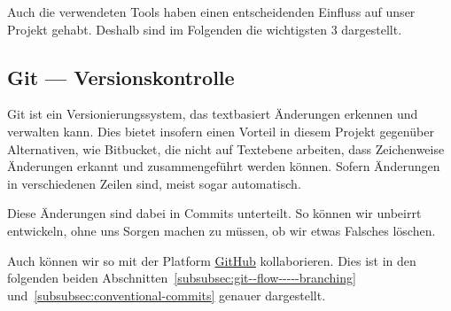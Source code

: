 Auch die verwendeten Tools haben einen entscheidenden Einfluss auf unser Projekt gehabt.
Deshalb sind im Folgenden die wichtigsten 3 dargestellt.


\subsection{Git --- Versionskontrolle}\label{subsec:git-----versionskontrolle}
    Git ist ein Versionierungssystem, das textbasiert Änderungen erkennen und verwalten kann.
    Dies bietet insofern einen Vorteil in diesem Projekt gegenüber Alternativen, wie Bitbucket, die nicht auf Textebene arbeiten, dass Zeichenweise Änderungen erkannt und zusammengeführt werden können.
    Sofern Änderungen in verschiedenen Zeilen sind, meist sogar automatisch.


    Diese Änderungen sind dabei in Commits unterteilt.
    So können wir unbeirrt entwickeln, ohne uns Sorgen machen zu müssen, ob wir etwas Falsches löschen.


    Auch können wir so mit der Platform \href{https://github.com/WHS-SLAB-WiSe22-23-P1/Labyrinth}{GitHub} kollaborieren.
    Dies ist in den folgenden beiden Abschnitten~\ref{subsubsec:git--flow-----branching} und~\ref{subsubsec:conventional-commits} genauer dargestellt.

